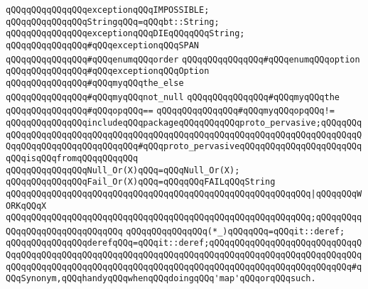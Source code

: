 \newline
\verb|qQQqqQQqqQQqqQQqexceptionqQQqIMPOSSIBLE;|\newline
\newline
\verb|qQQqqQQqqQQqqQQqStringqQQq=qQQqbt::String;|\newline
\newline
\verb|qQQqqQQqqQQqqQQqexceptionqQQqDIEqQQqqQQqString;|\newline
\newline
\verb|qQQqqQQqqQQqqQQq#qQQqexceptionqQQqSPAN|\newline
\verb|qQQqqQQqqQQqqQQq#qQQqenumqQQqorder|\newline
\verb|qQQqqQQqqQQqqQQq#qQQqenumqQQqoption|\newline
\verb|qQQqqQQqqQQqqQQq#qQQqexceptionqQQqOption|\newline
\verb|qQQqqQQqqQQqqQQq#qQQqmyqQQqthe_else|\newline
\verb|qQQqqQQqqQQqqQQq#qQQqmyqQQqnot_null|\newline
\verb|qQQqqQQqqQQqqQQq#qQQqmyqQQqthe|\newline
\verb|qQQqqQQqqQQqqQQq#qQQqopqQQq==|\newline
\verb|qQQqqQQqqQQqqQQq#qQQqmyqQQqopqQQq!=|\newline
\newline
\verb|qQQqqQQqqQQqqQQqincludeqQQqpackageqQQqqQQqqQQqproto_pervasive;qQQqqQQqqQQqqQQqqQQqqQQqqQQqqQQqqQQqqQQqqQQqqQQqqQQqqQQqqQQqqQQqqQQqqQQqqQQqqQQqqQQqqQQqqQQqqQQqqQQqqQQq#qQQqproto_pervasiveqQQqqQQqqQQqqQQqqQQqqQQqqQQqisqQQqfromqQQqqQQqqQQq|\newline
\newline
\verb|qQQqqQQqqQQqqQQqNull_Or(X)qQQq=qQQqNull_Or(X);|\newline
\newline
\verb|qQQqqQQqqQQqqQQqFail_Or(X)qQQq=qQQqqQQqFAILqQQqString|\newline
\verb|qQQqqQQqqQQqqQQqqQQqqQQqqQQqqQQqqQQqqQQqqQQqqQQqqQQqqQQqqQQq|\verb#|qQQqqQQqWORKqQQqX#\newline
\verb|qQQqqQQqqQQqqQQqqQQqqQQqqQQqqQQqqQQqqQQqqQQqqQQqqQQqqQQqqQQq;qQQqqQQqqQQqqQQqqQQqqQQqqQQqqQQq|\newline
\newline
\verb|qQQqqQQqqQQqqQQq(*_)qQQqqQQq=qQQqit::deref;|\newline
\verb|qQQqqQQqqQQqqQQqderefqQQq=qQQqit::deref;qQQqqQQqqQQqqQQqqQQqqQQqqQQqqQQqqQQqqQQqqQQqqQQqqQQqqQQqqQQqqQQqqQQqqQQqqQQqqQQqqQQqqQQqqQQqqQQqqQQqqQQqqQQqqQQqqQQqqQQqqQQqqQQqqQQqqQQqqQQqqQQqqQQqqQQqqQQqqQQqqQQqqQQq#qQQqSynonym,qQQqhandyqQQqwhenqQQqdoingqQQq'map'qQQqorqQQqsuch.|\newline
